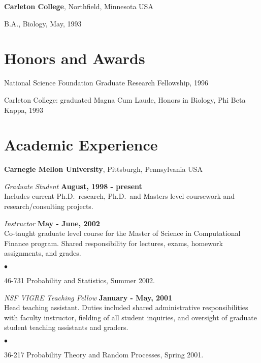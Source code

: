 \documentclass[margin,line]{res}
\newenvironment{list1}{
  \begin{list}{\ding{113}}{%
      \setlength{\itemsep}{0in}
      \setlength{\parsep}{0in} \setlength{\parskip}{0in}
      \setlength{\topsep}{0in} \setlength{\partopsep}{0in}
      \setlength{\leftmargin}{0.17in}}}{\end{list}}
\newenvironment{list2}{
  \begin{list}{$\bullet$}{%
  }}{\end{list}}
\begin{document}
\begin{resume}
{\bf Carleton College}, Northfield, Minnesota USA\\
\vspace*{-.1in}
\begin{list1}
\item[] B.A., Biology,  May, 1993
\end{list1}


\section{\sc Honors and Awards}
National Science Foundation Graduate Research Fellowship, 1996

%
\vspace*{-2.5mm}
Carleton College: graduated Magna Cum Laude, Honors in Biology, Phi Beta Kappa, 1993

\section{\sc Academic Experience}
{\bf Carnegie Mellon University}, Pittsburgh, Pennsylvania USA

\vspace{-.3cm}
{\em Graduate Student} \hfill {\bf August, 1998 - present}\\
Includes current Ph.D.~research, Ph.D.~and Masters level coursework and
research/consulting projects.

{\em Instructor} \hfill {\bf May - June, 2002}\\
Co-taught graduate level course for the Master of Science in
Computational Finance program.  Shared responsibility for lectures, exams,
homework assignments, and  grades.
\vspace*{.05in}
\begin{list2}
\item 46-731 Probability and Statistics, Summer 2002.
\end{list2}


{\em NSF VIGRE Teaching Fellow} \hfill {\bf January - May, 2001}\\
Head teaching assistant.
Duties included  shared administrative responsibilities with faculty
instructor, fielding of all student inquiries, and oversight of
graduate student teaching assistants and graders.
\vspace*{.05in}
\begin{list2}
\item 36-217 Probability Theory and Random Processes, Spring 2001.
\end{list2}


\end{resume}
\end{document}
